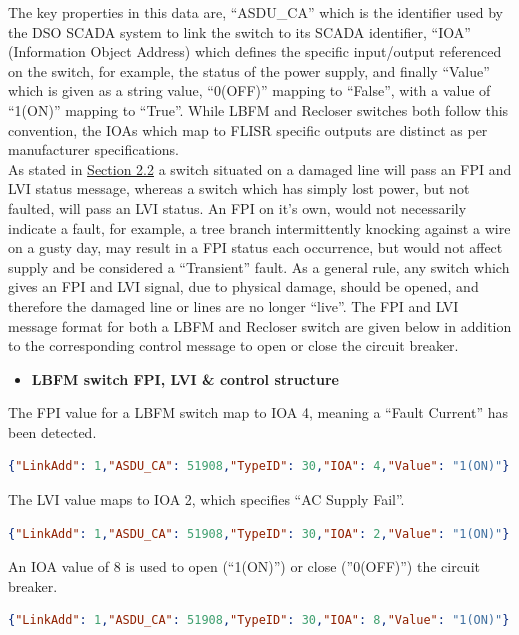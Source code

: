 \noindent The key properties in this data are, ``ASDU\_CA'' which is the identifier used by the DSO SCADA system to link the switch to its SCADA identifier, ``IOA'' (Information Object Address) which defines the specific input/output
referenced on the switch, for example, the status of the power supply, and finally ``Value'' which is given as a string value, ``0(OFF)'' mapping to ``False'', with a value of ``1(ON)'' mapping to ``True''.
While LBFM and Recloser switches both follow this convention, the IOAs which map to FLISR specific outputs are distinct as per manufacturer specifications.
\\
As stated in \hyperref[sec:flisr]{Section 2.2} a switch situated on a damaged line will pass an FPI and LVI status message, whereas a switch which has simply lost power, but not faulted, will pass an LVI status.
An FPI on it's own, would not necessarily indicate a fault, for example, a tree branch intermittently knocking against a wire on a gusty day, may result in a FPI status each occurrence,
but would not affect supply and be considered a ``Transient'' fault. As a general rule, any switch which gives an FPI and LVI signal, due to physical damage, should be opened, and therefore the damaged line or lines are no longer ``live''.
The FPI and LVI message format for both a LBFM and Recloser switch are given below in addition to the corresponding control message to open or close the circuit breaker.

\begin{itemize}
  \item \textbf{LBFM switch FPI, LVI \& control structure}
\end{itemize}

\noindent The FPI value for a LBFM switch map to IOA 4, meaning a ``Fault Current'' has been detected.
\\
\begin{lstlisting}[language=json]
  {"LinkAdd": 1,"ASDU_CA": 51908,"TypeID": 30,"IOA": 4,"Value": "1(ON)"}
\end{lstlisting}

\noindent The LVI value maps to IOA 2, which specifies ``AC Supply Fail''.
\\
\begin{lstlisting}[language=json]
  {"LinkAdd": 1,"ASDU_CA": 51908,"TypeID": 30,"IOA": 2,"Value": "1(ON)"}
\end{lstlisting}

\noindent An IOA value of 8 is used to open (``1(ON)'') or close (''0(OFF)'') the circuit breaker.
\\
\begin{lstlisting}[language=json]
  {"LinkAdd": 1,"ASDU_CA": 51908,"TypeID": 30,"IOA": 8,"Value": "1(ON)"}
\end{lstlisting}

